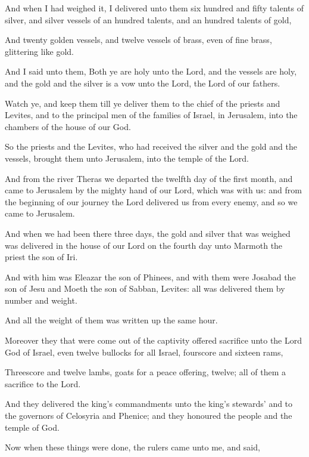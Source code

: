 {\par }{\PP {}And when I had weighed it, I delivered unto them six hundred and fifty talents of silver, and silver vessels of an hundred talents, and an hundred talents of gold,
\par }{\PP {}And twenty golden vessels, and twelve vessels of brass, even of fine brass, glittering like gold.
\par }{\PP {}And I said unto them, Both ye are holy unto the Lord, and the vessels are holy, and the gold and the silver is a vow unto the Lord, the Lord of our fathers.
\par }{\PP {}Watch ye, and keep them till ye deliver them to the chief of the priests and Levites, and to the principal men of the families of Israel, in Jerusalem, into the chambers of the house of our God.
\par }{\PP {}So the priests and the Levites, who had received the silver and the gold and the vessels, brought them unto Jerusalem, into the temple of the Lord.
\par }{\PP {}And from the river Theras we departed the twelfth day of the first month, and came to Jerusalem by the mighty hand of our Lord, which was with us: and from the beginning of our journey the Lord delivered us from every enemy, and so we came to Jerusalem.
\par }{\PP {}And when we had been there three days, the gold and silver that was weighed was delivered in the house of our Lord on the fourth day unto Marmoth the priest the son of Iri.
\par }{\PP {}And with him was Eleazar the son of Phinees, and with them were Josabad the son of Jesu and Moeth the son of Sabban, Levites: all was delivered them by number and weight.
\par }{\PP {}And all the weight of them was written up the same hour.
\par }{\PP {}Moreover they that were come out of the captivity offered sacrifice unto the Lord God of Israel, even twelve bullocks for all Israel, fourscore and sixteen rams,
\par }{\PP {}Threescore and twelve lambs, goats for a peace offering, twelve; all of them a sacrifice to the Lord.
\par }{\PP {}And they delivered the king’s commandments unto the king’s stewards’ and to the governors of Celosyria and Phenice; and they honoured the people and the temple of God.
\par }{\PP {}Now when these things were done, the rulers came unto me, and said,
}
